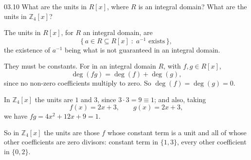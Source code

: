 \documentclass[11pt]{article}
\begin{document}
\begin{problem}{03.10}
  What are the units in $R[x]$, where $R$ is an integral domain? What are the
  units in $\mathbb{Z}_{4}[x]$?
\end{problem}
\begin{solution}
  The units in $R[x]$, for $R$ an integral domain, are
  \[
    \{\, a \in R \subseteq R[x] \;:\; a^{-1} \text{ exists} \,\},
  \]
  the existence of $a^{-1}$ being what is not guaranteed in an integral
  domain.

  They must be constants. For in an integral domain $R$, with $f, g \in R[x]$,
  \[
    \deg(fg) = \deg(f) + \deg(g),
  \]
  since no non-zero coefficients multiply to zero. So $\deg(f) = \deg(g) = 0$.

  In $\mathbb{Z}_{4}[x]$ the units are $1$ and $3$, since $3 \cdot 3 = 9 \equiv
  1$; and also, taking
  \[
    f(x) = 2x + 3, \qquad g(x) = 2x + 3,
  \]
  we have $fg = 4x^{2} + 12x + 9 = 1$.

  So in $\mathbb{Z}_{4}[x]$ the units are those $f$ whose constant term is a
  unit and all of whose other coefficients are zero divisors: constant term in
  $\{1,3\}$, every other coefficient in $\{0,2\}$.
\end{solution}
\end{document}
